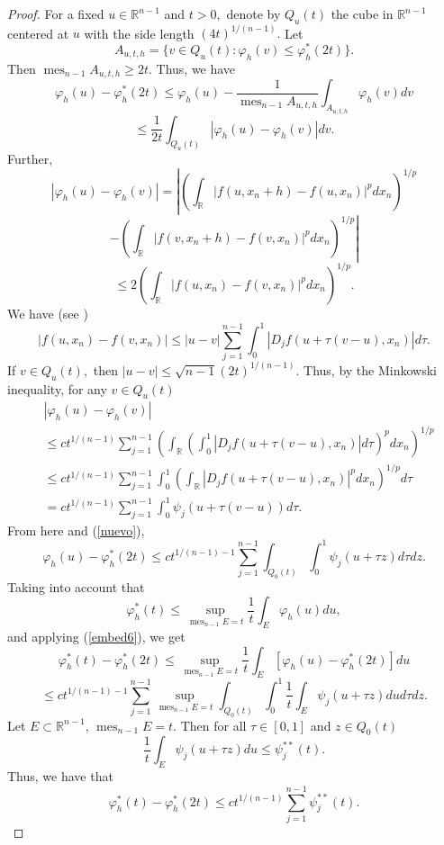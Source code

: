 \documentclass[12pt,twoside,reqno]{amsart}
\numberwithin{equation}{section}
\theoremstyle{definition}
\numberwithin{equation}{section}
\def\R{\mathbb{R}}
\def\f{\varphi}
\def\mes{\operatorname{mes}}
\begin{document}
\begin{proof}
For a fixed $u\in \R^{n-1}$ and $t>0,$ denote by $Q_u(t)$ the cube in $\R^{n-1}$ centered at $u$ with the side length $(4t)^{1/(n-1)}.$
Let
$$
A_{u,t,h} =\{v\in Q_u(t): \f_h(v)\le \f_h^*(2t)\}.
$$
Then $\mes_{n-1}A_{u,t,h}\ge 2t.$ Thus, we have
$$
\f_h(u)-\f_h^*(2t)\le \f_h(u)-\frac{1}{\mes_{n-1}A_{u,t,h}}\int_{A_{u,t,h}}\f_h(v)dv
$$
\begin{equation}\label{nuevo}
\le \frac1{2t}\int_{Q_u(t)} |\f_h(u)-\f_h(v)|dv.
\end{equation}
Further,
$$
|\f_h(u)-\f_h(v)|=\left|\left(\int_\R|f(u,x_n+h)-f(u,x_n)|^pdx_n\right)^{1/p}\right.
$$
$$
-\left.\left(\int_\R|f(v,x_n+h)-f(v,x_n)|^pdx_n\right)^{1/p}\right|
$$
$$
\le 2\left(\int_\R|f(u,x_n)-f(v,x_n)|^pdx_n\right)^{1/p}.
$$
We have (see \cite[p. 143]{LL})
$$
|f(u,x_n)-f(v,x_n)|\le|u-v|\sum_{j=1}^{n-1}\int_0^1|D_jf(u+\tau(v-u), x_n)|d\tau.
$$
If $v\in Q_u(t),$ then $|u-v|\le \sqrt{n-1}(2t)^{1/(n-1)}.$ Thus, by the Minkowski inequality, for any $v\in Q_u(t)$
$$
\begin{aligned}
&|\f_h(u)-\f_h(v)|\\
&\le c t^{1/(n-1)}\sum_{j=1}^{n-1}\left(\int_\R\left(\int_0^1|D_jf(u+\tau(v-u), x_n)|d\tau\right)^pdx_n\right)^{1/p}\\
&\le ct^{1/(n-1)}\sum_{j=1}^{n-1}\int_0^1\left(\int_\R|D_jf(u+\tau(v-u), x_n)|^pdx_n\right)^{1/p}d\tau\\
&=ct^{1/(n-1)}\sum_{j=1}^{n-1}\int_0^1\psi_j(u+\tau(v-u))d\tau.
\end{aligned}
$$
From here and (\ref{nuevo}),
\begin{equation}\label{embed6}
\f_h(u)-\f_h^*(2t)\le ct^{1/(n-1)-1}\sum_{j=1}^{n-1}\int_{Q_0(t)}\int_0^1\psi_j(u+\tau z)d\tau dz.
\end{equation}
Taking into account that
$$
\f_h^*(t)\le \sup_{\mes_{n-1}E=t}\frac1t\int_E\f_h(u)du,
$$
and applying
 (\ref{embed6}), we get
 $$
 \f_h^*(t)-\f_h^*(2t)\le \sup_{\mes_{n-1}E=t}\frac1t\int_E[\f_h(u)-\f_h^*(2t)]du
$$
$$
\le  ct^{1/(n-1)-1}\sum_{j=1}^{n-1}\sup_{\mes_{n-1}E=t}\int_{Q_0(t)}\int_0^1\frac1t\int_E\psi_j(u+\tau z)dud\tau dz.
$$ 
Let $E\subset \R^{n-1}$, $\mes_{n-1} E=t$. Then for all $\tau\in [0,1]$ and $z\in Q_0(t)$
$$
\frac1t\int_E \psi_j(u+\tau z)du\le \psi^{**}_j(t).
$$
Thus, we have that
\begin{equation}\label{embed7}
\f_h^*(t)-\f_h^*(2t)\le ct^{1/(n-1)}\sum_{j=1}^{n-1}\psi^{**}_j(t).
\end{equation}


\end{proof}
\end{document}
